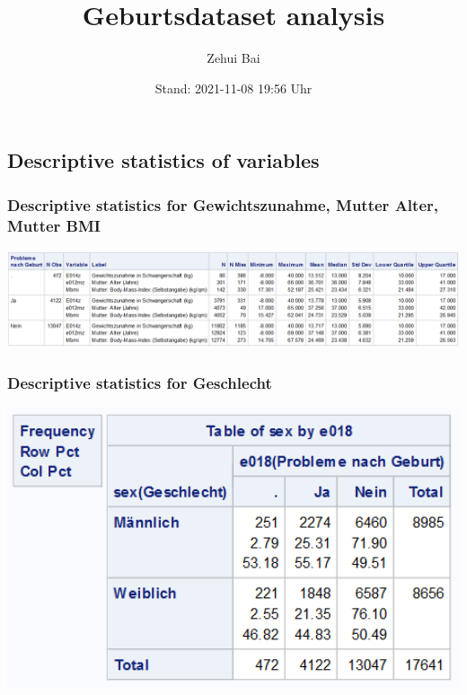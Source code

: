 \documentclass[
  10pt,
]{article}
\title{Geburtsdataset analysis}
\author{Zehui Bai}
\date{Stand: 2021-11-08 19:56 Uhr}
\begin{document}
\maketitle

{
\hypersetup{linkcolor=}
\setcounter{tocdepth}{2}
\tableofcontents
}
\hypertarget{descriptive-statistics-of-variables}{%
\subsection{Descriptive statistics of
variables}\label{descriptive-statistics-of-variables}}

\hypertarget{descriptive-statistics-for-gewichtszunahme-mutter-alter-mutter-bmi}{%
\subsubsection{Descriptive statistics for Gewichtszunahme, Mutter Alter,
Mutter
BMI}\label{descriptive-statistics-for-gewichtszunahme-mutter-alter-mutter-bmi}}

\includegraphics[width=17.97in]{./Yimeng_Plots/M7_0a}

\hypertarget{descriptive-statistics-for-geschlecht}{%
\subsubsection{Descriptive statistics for
Geschlecht}\label{descriptive-statistics-for-geschlecht}}

\includegraphics[width=6.39in]{./Yimeng_Plots/M7_0b}
\end{document}
